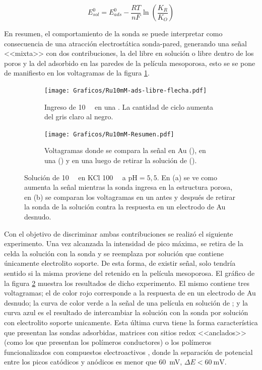 				\begin{equation}
				E^0_{sol} = E^0_{ads}-\frac{RT}{nF}\ln \left(\frac{K_R}{K_O}\right)
				\end{equation}

		En resumen, el comportamiento de la sonda se puede interpretar como consecuencia de una atracción electrostática sonda-pared, generando una señal <<mixta>> con dos contribuciones, la del \ru\space libre en solución o libre dentro de los poros y la del adsorbido en las paredes de la película mesoporosa, esto se se pone de manifiesto en los voltagramas de la figura \ref{fig:Ru10mM_ingreso}.

			\begin{figure}[th]
				\begin{subfigure}[t]{0.495\textwidth}
				\texttt{[image: Graficos/Ru10mM-ads-libre-flecha.pdf]}
		        \caption{Ingreso de \ru\space \SI{10}{\milli\Molar} en una \pdmF. La cantidad de ciclo aumenta del gris  claro al negro.}
		        \label{fig:Ru10mM_ingreso}
		      	\end{subfigure}
		      	\begin{subfigure}[t]{0.495\textwidth}
				\texttt{[image: Graficos/Ru10mM-Resumen.pdf]}
		        \caption{Voltagramas donde se compara la señal en Au (\usebox{\punteado}), en una \pdmF\space(\usebox{\gris}) y en una \pdmF\space luego de retirar la solución de \ru (\usebox{\negro}).}
		        \label{fig:Ru10mM-resumen}
		      	\end{subfigure}
		      	\caption[Adsorción de sonda positiva en \pdmF]{Solución de \ru\space \SI{10}{\milli\Molar} en KCl \SI{100}{\milli\Molar} a $\text{pH}=5,5$. En (a) se ve como aumenta la señal mientras la sonda ingresa en la estructura porosa, en (b) se comparan los voltagramas en un \pdmF\space antes y después de retirar la sonda de la solución contra la respuesta en un electrodo de Au desnudo.}
		      	\label{fig:primero-Ru10mM}
		      	\end{figure}

		Con el objetivo de discriminar ambas contribuciones se realizó el siguiente experimento. Una vez alcanzada la intensidad de pico máxima, se retira de la celda la solución con la sonda y se reemplaza por solución que contiene únicamente electrolito soporte. De esta forma, de existir señal, solo tendría sentido si la misma proviene del \ru\space retenido en la película mesoporosa. El gráfico de la figura \ref{fig:Ru10mM-resumen} muestra los resultados de dicho experimento. El mismo contiene tres voltagramas; el de color rojo corresponde a la respuesta de \ru\space en un electrodo de Au desnudo; la curva de color verde a la señal de una película en solución de \ru; y la curva azul es el resultado de intercambiar la solución con la sonda por solución con electrolito soporte unicamente. Esta última curva tiene la forma característica que presentan las sondas adsorbidas, matrices con sitios redox <<anclados>>\cite{ybarra2005} (como los que presentan los polímeros conductores) o los polímeros funcionalizados con compuestos electroactivos \cite{Rohlfing2005,Vila2015}, donde la separación de potencial entre los picos catódicos y anódicos es menor que \SI{60}{\milli\volt}, $\Delta E < \SI{60}{\milli\volt}$\cite{Wi2000}.

